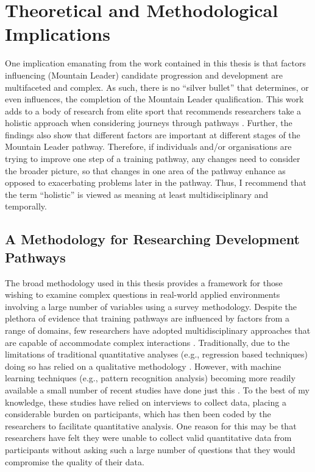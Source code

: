 \documentclass[
  12pt,
  a4paper,
]{book}
\begin{document}
\hypertarget{theoretical-and-methodological-implications}{%
\section{Theoretical and Methodological Implications}\label{theoretical-and-methodological-implications}}

One implication emanating from the work contained in this thesis is that factors influencing (Mountain Leader) candidate progression and development are multifaceted and complex. As such, there is no ``silver bullet'' that determines, or even influences, the completion of the Mountain Leader qualification. This work adds to a body of research from elite sport that recommends researchers take a holistic approach when considering journeys through pathways \citep[e.g.,][]{Jones2019a, Gullich2019, Hardy2017}. Further, the findings also show that different factors are important at different stages of the Mountain Leader pathway. Therefore, if individuals and/or organisations are trying to improve one step of a training pathway, any changes need to consider the broader picture, so that changes in one area of the pathway enhance as opposed to exacerbating problems later in the pathway. Thus, I recommend that the term ``holistic'' is viewed as meaning at least multidisciplinary and temporally.

\hypertarget{a-methodology-for-researching-development-pathways}{%
\subsection{A Methodology for Researching Development Pathways}\label{a-methodology-for-researching-development-pathways}}

The broad methodology used in this thesis provides a framework for those wishing to examine complex questions in real-world applied environments involving a large number of variables using a survey methodology. Despite the plethora of evidence that training pathways are influenced by factors from a range of domains, few researchers have adopted multidisciplinary approaches that are capable of accommodate complex interactions \citep[cf.~][]{Rees2016, Gullich2019}. Traditionally, due to the limitations of traditional quantitative analyses (e.g., regression based techniques) doing so has relied on a qualitative methodology \citep[e.g.,][]{Hardy2017}. However, with machine learning techniques (e.g., pattern recognition analysis) becoming more readily available a small number of recent studies have done just this \citep[e.g.,][]{Gullich2019, Jones2019a, Jones2020}. To the best of my knowledge, these studies have relied on interviews to collect data, placing a considerable burden on participants, which has then been coded by the researchers to facilitate quantitative analysis. One reason for this may be that researchers have felt they were unable to collect valid quantitative data from participants without asking such a large number of questions that they would compromise the quality of their data.
\end{document}
